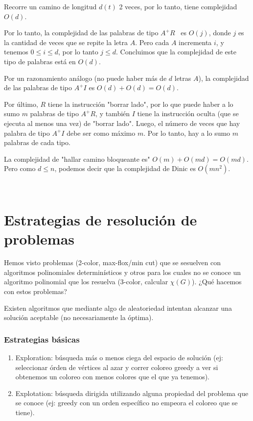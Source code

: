 \documentclass[10pt,a4paper]{article}
\begin{document}
Recorre un camino de longitud $d(t)$ 2 veces, por lo tanto, tiene complejidad $O(d)$.

Por lo tanto, la complejidad de las palabras de tipo $A^+R$  es $O(j)$, donde $j$ es la cantidad de veces que se repite la letra $A$. Pero cada $A$ incrementa $i$, y tenemos $0 \leq i \leq d$, por lo tanto $j\leq d$. Concluimos que la complejidad de este tipo de palabras está en $O(d)$.

Por un razonamiento análogo (no puede haber más de $d$ letras $A$), la complejidad de las palabras de tipo $A^+I$ es $O(d) + O(d) = O(d)$.

Por último, $R$ tiene la instrucción "borrar lado", por lo que puede haber a lo sumo $m$ palabras de tipo $A^+R$, y también $I$ tiene la instrucción oculta (que se ejecuta al menos una vez) de "borrar lado". Luego, el número de veces que hay palabra de tipo $A^+I$ debe ser como máximo $m$. Por lo tanto, hay a lo sumo $m$ palabras de cada tipo.

La complejidad de "hallar camino bloqueante es" $O(m) + O(md) = O(md)$. Pero como $d\leq n$, podemos decir que la complejidad de Dinic es $O(mn^2)$.

 

\section*{Estrategias de resolución de problemas}

Hemos visto problemas (2-color, max-flox/min cut) que se sesuelven con algoritmos polinomiales determinísticos y otros para los cuales no se conoce un algoritmo polinomial que los resuelva (3-color, calcular $\chi(G)$). ¿Qué hacemos con estos problemas?

Existen algoritmos que mediante algo de aleatoriedad intentan alcanzar una solución aceptable (no necesariamente la óptima).

\subsubsection*{Estrategias básicas}

\begin{enumerate}

	\item Exploration: búsqueda más o menos ciega del espacio de solución (ej: seleccionar órden de vértices al azar y correr coloreo greedy a ver si obtenemos un coloreo con menos colores que el que ya tenemos).
	\item Explotation: búsqueda dirigida utilizando alguna propiedad del problema que se conoce (ej: greedy con un orden específico no empeora el coloreo que se tiene).
\end{enumerate}
\end{document}
